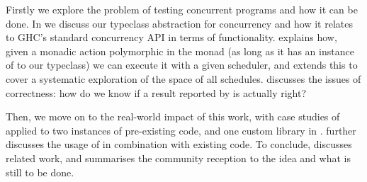Firstly we explore the problem of testing concurrent programs and how
it can be done. In \textbf{} we discuss our
typeclass abstraction for concurrency and how it relates to GHC's
standard concurrency API in terms of
functionality. \textbf{} explains how, given a monadic
action polymorphic in the monad (as long as it has an instance of to
our typeclass) we can execute it with a given scheduler, and
\textbf{} extends this to cover a systematic exploration of
the space of all schedules. \textbf{} discusses the
issues of correctness: how do we know if a result reported by
\dejafu{} is actually right?

Then, we move on to the real-world impact of this work, with case
studies of \dejafu{} applied to two instances of pre-existing code,
and one custom library in \textbf{}.
\textbf{} further discusses the usage of \dejafu{} in
combination with existing code. To conclude,
\textbf{} discusses related work, and summarises the
community reception to the idea and what is still to be done.
